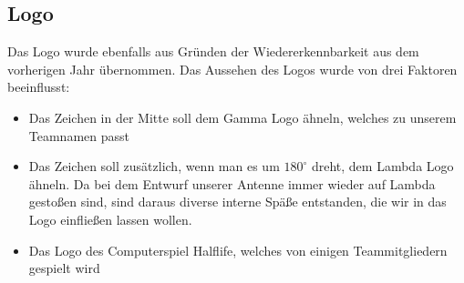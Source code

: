 \subsection{Logo}
Das Logo wurde ebenfalls aus Gründen der Wiedererkennbarkeit aus dem vorherigen Jahr übernommen. Das Aussehen des Logos wurde von drei Faktoren beeinflusst:
\begin{itemize}
	\item Das Zeichen in der Mitte soll dem Gamma Logo ähneln, welches zu unserem Teamnamen passt
	\item Das Zeichen soll zusätzlich, wenn man es um $180^\circ$ dreht, dem Lambda Logo ähneln. Da bei dem Entwurf unserer Antenne immer wieder auf Lambda gestoßen sind, sind daraus diverse interne Späße entstanden, die wir in das Logo einfließen lassen wollen.
	\item Das Logo des Computerspiel Halflife, welches von einigen Teammitgliedern gespielt wird
\end{itemize}